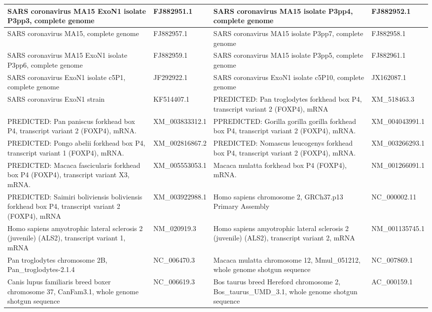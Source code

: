 \documentclass[10.9pt]{article} %
\begin{document}
{\begin{longtable}{|p{4.5cm}|p{3.5cm}|p{4.5cm}|p{3.5cm}|}
 \hline
  SARS coronavirus MA15 ExoN1 isolate P3pp3, complete genome & FJ882951.1  & SARS coronavirus MA15 isolate P3pp4, complete genome & FJ882952.1 \\
 \hline
  SARS coronavirus MA15, complete genome & FJ882957.1   & SARS coronavirus MA15 isolate P3pp7, complete genome & FJ882958.1 \\
 \hline
  SARS coronavirus MA15 ExoN1 isolate P3pp6, complete genome & FJ882959.1   & SARS coronavirus MA15 isolate P3pp5, complete genome & FJ882961.1 \\
 \hline
   SARS coronavirus ExoN1 isolate c5P1, complete genome & JF292922.1   & SARS coronavirus ExoN1 isolate c5P10, complete genome & JX162087.1 \\
 \hline
 SARS coronavirus ExoN1 strain & KF514407.1   &  PREDICTED: Pan troglodytes forkhead box P4, transcript variant 2 (FOXP4), mRNA & XM\_518463.3  \\
 \hline
  PREDICTED: Pan paniscus forkhead box P4, transcript variant 2 (FOXP4), mRNA. & XM\_003833312.1 & PPREDICTED: Gorilla gorilla gorilla forkhead box P4, transcript variant 2 (FOXP4), mRNA. & XM\_004043991.1  \\
 \hline
   PREDICTED: Pongo abelii forkhead box P4, transcript variant 1 (FOXP4), mRNA. & XM\_002816867.2 & PREDICTED: Nomascus leucogenys forkhead box P4, transcript variant 2 (FOXP4), mRNA. & XM\_003266293.1  \\
 \hline
  PREDICTED: Macaca fascicularis forkhead box P4 (FOXP4), transcript variant X3, mRNA. & XM\_005553053.1 & Macaca mulatta forkhead box P4 (FOXP4), mRNA. & NM\_001266091.1  \\
 \hline
   PREDICTED: Saimiri boliviensis boliviensis forkhead box P4, transcript variant 2 (FOXP4), mRNA & XM\_003922988.1 &  Homo sapiens chromosome 2, GRCh37.p13 Primary Assembly &  NC\_000002.11 \\
 \hline
   Homo sapiens amyotrophic lateral sclerosis 2 (juvenile) (ALS2), transcript variant 1, mRNA & NM\_020919.3 &  Homo sapiens amyotrophic lateral sclerosis 2 (juvenile) (ALS2), transcript variant 2, mRNA &  NM\_001135745.1 \\
 \hline
  Pan troglodytes chromosome 2B, Pan\_troglodytes-2.1.4 & NC\_006470.3 &  Macaca mulatta chromosome 12, Mmul\_051212, whole genome shotgun sequence &  NC\_007869.1 \\
 \hline
   Canis lupus familiaris breed boxer chromosome 37, CanFam3.1, whole genome shotgun sequence & NC\_006619.3 &  Bos taurus breed Hereford chromosome 2, Bos\_taurus\_UMD\_3.1, whole genome shotgun sequence &  AC\_000159.1 \\

\end{longtable}}
\end{document}
